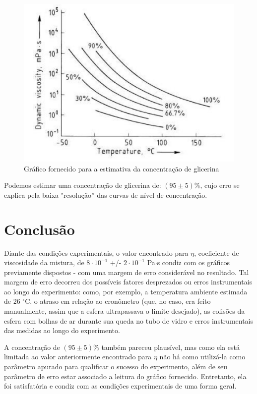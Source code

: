 \documentclass[english,brazil]{article}
\begin{document}
			\begin{figure}[!ht]
				\centering
					\includegraphics[scale=0.3]{graf_png.png}
				\caption{Gráfico fornecido para a estimativa da concentração de glicerina}
			\end{figure}

			Podemos estimar uma concentração de glicerina de: $(95\pm5)\%$, cujo erro se explica pela baixa "resolução'' das curvas de nível de concentração.


	\section{Conclusão}

	Diante das condições experimentais, o valor encontrado para $\eta$, coeficiente de viscosidade da mistura, de $8 \cdot 10^{-1}$ +/- $2 \cdot 10^{-1}$ Pa$\cdot$s condiz com os gráficos previamente dispostos - com uma margem de erro considerável no resultado. Tal margem de erro decorreu dos possíveis fatores desprezados ou erros instrumentais ao longo do experimento: como, por exemplo, a temperatura ambiente estimada de 26 $^{\circ}$C, o atraso em relação ao cronômetro (que, no caso, era feito manualmente, assim que a esfera ultrapassava o limite desejado), as colisões da esfera com bolhas de ar durante sua queda no tubo de vidro e erros instrumentais das medidas ao longo do experimento.

	A concentração de $(95\pm5)\%$ também pareceu plausível, mas como ela está limitada ao valor anteriormente encontrado para $\eta$ não há como utilizá-la como parâmetro apurado para qualificar o sucesso do experimento, além de seu parâmetro de erro estar associado a leitura do gráfico fornecido. Entretanto, ela foi satisfatória e condiz com as condições experimentais de uma forma geral.
	
\end{document}

